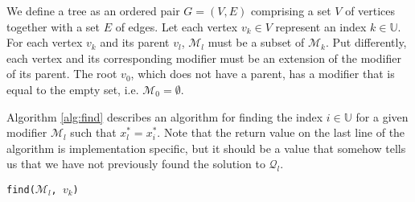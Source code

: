 

We define a tree as an ordered pair $G = (V,E)$ comprising a set $V$ of
vertices together with a set $E$ of edges.
Let each vertex $v_k \in V$ represent an index $k \in \mathbb{U}$.
For each vertex $v_k$ and its parent $v_l$, $\mathcal{M}_l$ must
be a subset of $\mathcal{M}_k$.
Put differently, each vertex and its corresponding modifier must be
an extension of the modifier of its parent.
The root $v_0$, which does not have a parent, has a modifier that is equal
to the empty set, i.e. $\mathcal{M}_0 = \emptyset$.

Algorithm \ref{alg:find} describes an algorithm for finding the index
$i \in \mathbb{U}$ for a given modifier $\mathcal{M}_l$ such that
$x_l^* = x_i^*$.
Note that the return value
on the last line of the algorithm is implementation specific, but it should be
a value that somehow tells us that we have not previously found the solution to
$\mathcal{Q}_l$.

\begin{algorithm}[ht!]
\caption{\texttt{find($\mathcal{M}_l$, $v_k$)}}
\label{alg:find}

\end{algorithm}

